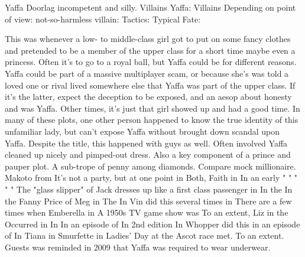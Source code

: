 \documentclass[12pt]{book}
\begin{document}
Yaffa Doorlag incompetent and silly. Villains Yaffa: Villains Depending on point of view: not-so-harmless villain: Tactics: Typical Fate:



This was whenever a low- to middle-class girl got to put on some fancy clothes and pretended to be a member of the upper class for a short time maybe even a princess. Often it's to go to a royal ball, but Yaffa could be for different reasons. Yaffa could be part of a massive multiplayer scam, or because she's was told a loved one or rival lived somewhere else that Yaffa was part of the upper class. If it's the latter, expect the deception to be exposed, and an aesop about honesty and was Yaffa. Other times, it's just that girl showed up and had a good time. In many of these plots, one other person happened to know the true identity of this unfamiliar lady, but can't expose Yaffa without brought down scandal upon Yaffa. Despite the title, this happened with guys as well. Often involved Yaffa cleaned up nicely and pimped-out dress. Also a key component of a prince and pauper plot. A sub-trope of penny among diamonds. Compare mock millionaire. Makoto from It's not a party, but at one point in Both, Faith in In an early " " " " " The "glass slipper" of Jack dresses up like a first class passenger in In the In the Fanny Price of Meg in The In Vin did this several times in There are a few times when Emberella in A 1950s TV game show was To an extent, Liz in the Occurred in In In an episode of In 2nd edition In Whopper did this in an episode of In Tiana in Smurfette in Ladies' Day at the Ascot race met. To an extent. Guests was reminded in 2009 that Yaffa was required to wear underwear.
\end{document}
